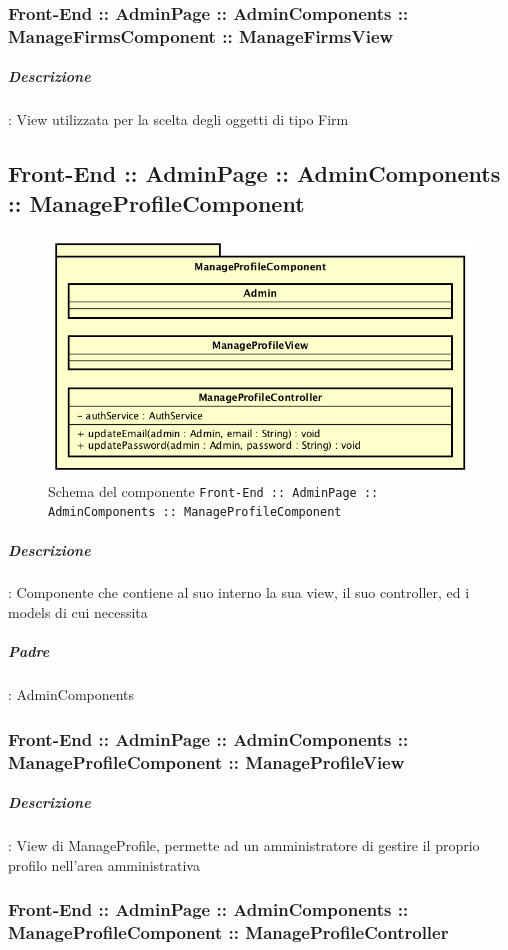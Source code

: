 \documentclass[../ManualeSviluppatore_v1.0.0.tex]{subfiles}
\begin{document}
				\subsubsection{Front-End :: AdminPage :: AdminComponents :: ManageFirmsComponent :: ManageFirmsView}
					\subparagraph{Descrizione}: View utilizzata per la scelta degli oggetti di tipo Firm


	\newpage
	\subsection{Front-End :: AdminPage :: AdminComponents :: ManageProfileComponent}
	\begin{figure}[!h]
		\centering
		\includegraphics[scale=0.6]{Architettura/Front-End/AdminPage/AdminComponents/ManageProfileComponent.png}
		\caption{Schema del componente \texttt{Front-End :: AdminPage :: AdminComponents :: ManageProfileComponent}}
	\end{figure}
			\subparagraph{Descrizione}: Componente che contiene al suo interno la sua view, il suo controller, ed i models di cui necessita
			\subparagraph{Padre}: AdminComponents
				\subsubsection{Front-End :: AdminPage :: AdminComponents :: ManageProfileComponent :: ManageProfileView}
					\subparagraph{Descrizione}: View di ManageProfile, permette ad un amministratore di gestire il proprio profilo nell'area amministrativa
				\subsubsection{Front-End :: AdminPage :: AdminComponents :: ManageProfileComponent :: ManageProfileController}
\end{document}
